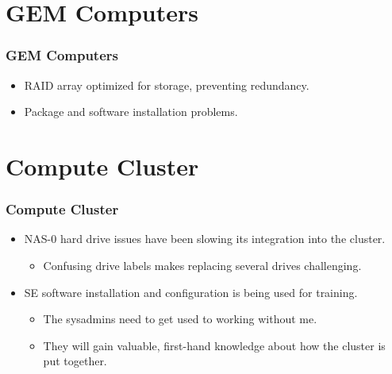\documentclass[aspectratio=169]{beamer}
\begin{document}

\section{GEM Computers}

\begin{frame}

  \frametitle{GEM Computers}

  \begin{itemize}
    \item RAID array optimized for storage, preventing redundancy.
    \item Package and software installation problems.
  \end{itemize}

\end{frame}



\section{Compute Cluster}

\begin{frame}

  \frametitle{Compute Cluster}

  \begin{itemize}
  \item NAS-0 hard drive issues have been slowing its integration into the cluster.
    \begin{itemize}
      \item Confusing drive labels makes replacing several drives challenging.
    \end{itemize}
  \item SE software installation and configuration is being used for training.
    \begin{itemize}
    \item The sysadmins need to get used to working without me.
    \item They will gain valuable, first-hand knowledge about how the
      cluster is put together.
    \end{itemize}
  \end{itemize}
  
\end{frame}

\end{document}
